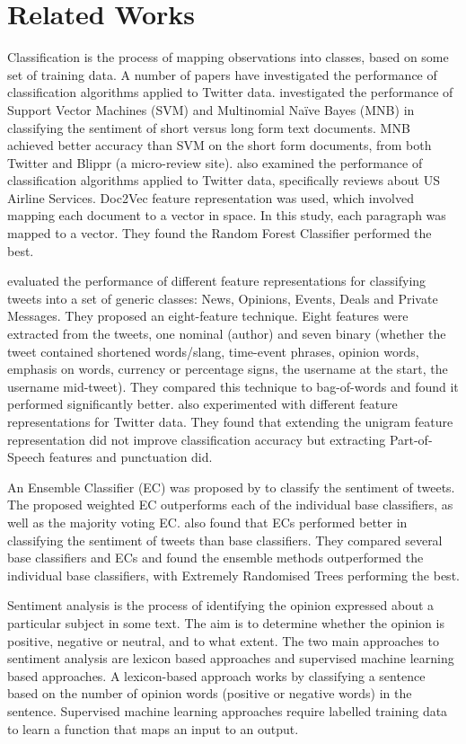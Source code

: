 \section{Related Works}

Classification is the process of mapping observations into classes, based on some set of training data. A number of papers have investigated the performance of classification algorithms applied to Twitter data. \cite{Berm2010} investigated the performance of Support Vector Machines (SVM) and Multinomial Naïve Bayes (MNB) in classifying the sentiment of short versus long form text documents. MNB achieved better accuracy than SVM on the short form documents, from both Twitter and Blippr (a micro-review site). \cite{Rane2018} also examined the performance of classification algorithms applied to Twitter data, specifically reviews about US Airline Services. Doc2Vec feature representation was used, which involved mapping each document to a vector in space. In this study, each paragraph was mapped to a vector. They found the Random Forest Classifier performed the best.

\cite{sriram2010} evaluated the performance of different feature representations for classifying tweets into a set of generic classes: News, Opinions, Events, Deals and Private Messages. They proposed an eight-feature technique. Eight features were extracted from the tweets, one nominal (author) and seven binary (whether the tweet contained shortened words/slang, time-event phrases, opinion words, emphasis on words, currency or percentage signs, the username at the start, the username mid-tweet). They compared this technique to bag-of-words and found it performed significantly better. \cite{Berm2010} also experimented with different feature representations for Twitter data. They found that extending the unigram feature representation did not improve classification accuracy but extracting Part-of-Speech features and punctuation did. 

An Ensemble Classifier (EC) was proposed by \cite{Ankit2018} to classify the sentiment of tweets. The proposed weighted EC outperforms each of the individual base classifiers, as well as the majority voting EC. \cite{Kanakaraj2015} also found that ECs performed better in classifying the sentiment of tweets than base classifiers. They compared several base classifiers and ECs and found the ensemble methods outperformed the individual base classifiers, with Extremely Randomised Trees performing the best.

Sentiment analysis is the process of identifying the opinion expressed about a particular subject in some text. The aim is to determine whether the opinion is positive, negative or neutral, and to what extent. The two main approaches to sentiment analysis are lexicon based approaches and supervised machine learning based approaches. A lexicon-based approach works by classifying a sentence based on the number of opinion words (positive or negative words) in the sentence. Supervised machine learning approaches require labelled training data to learn a function that maps an input to an output.

